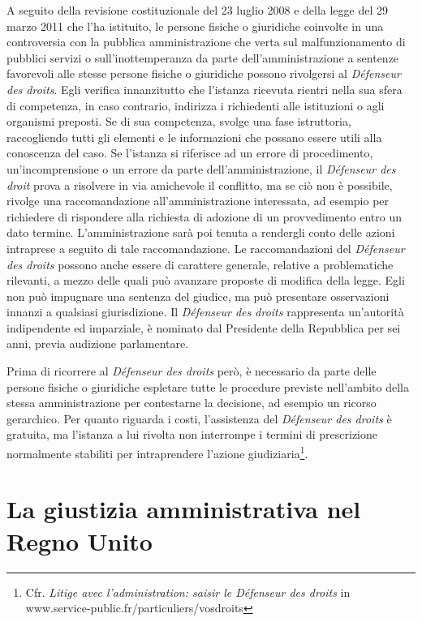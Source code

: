 \documentclass[12pt,it,a4paper,]{report}
\begin{document}
A seguito della revisione costituzionale del 23 luglio 2008 e della
legge del 29 marzo 2011 che l'ha istituito, le persone fisiche o
giuridiche coinvolte in una controversia con la pubblica amministrazione
che verta sul malfunzionamento di pubblici servizi o sull'inottemperanza
da parte dell'amministrazione a sentenze favorevoli alle stesse persone
fisiche o giuridiche possono rivolgersi al \emph{Défenseur des droits}.
Egli verifica innanzitutto che l'istanza ricevuta rientri nella sua
sfera di competenza, in caso contrario, indirizza i richiedenti alle
istituzioni o agli organismi preposti. Se di sua competenza, svolge una
fase istruttoria, raccogliendo tutti gli elementi e le informazioni che
possano essere utili alla conoscenza del caso. Se l'istanza si riferisce
ad un errore di procedimento, un'incomprensione o un errore da parte
dell'amministrazione, il \emph{Défenseur des droit} prova a risolvere in
via amichevole il conflitto, ma se ciò non è possibile, rivolge una
raccomandazione all'amministrazione interessata, ad esempio per
richiedere di rispondere alla richiesta di adozione di un provvedimento
entro un dato termine. L'amministrazione sarà poi tenuta a rendergli
conto delle azioni intraprese a seguito di tale raccomandazione. Le
raccomandazioni del \emph{Défenseur des droits} possono anche essere di
carattere generale, relative a problematiche rilevanti, a mezzo delle
quali può avanzare proposte di modifica della legge. Egli non può
impugnare una sentenza del giudice, ma può presentare osservazioni
innanzi a qualsiasi giurisdizione. Il \emph{Défenseur des droits}
rappresenta un'autorità indipendente ed imparziale, è nominato dal
Presidente della Repubblica per sei anni, previa audizione parlamentare.

Prima di ricorrere al \emph{Défenseur des droits} però, è necessario da
parte delle persone fisiche o giuridiche espletare tutte le procedure
previste nell'ambito della stessa amministrazione per contestarne la
decisione, ad esempio un ricorso gerarchico. Per quanto riguarda i
costi, l'assistenza del \emph{Défenseur des droits} è gratuita, ma
l'istanza a lui rivolta non interrompe i termini di prescrizione
normalmente stabiliti per intraprendere l'azione giudiziaria\footnote{Cfr.
  \emph{Litige avec l'administration: saisir le Défenseur des droits} in
  www.service-public.fr/particuliers/vosdroits}.

\hypertarget{la-giustizia-amministrativa-nel-regno-unito}{%
\chapter{La giustizia amministrativa nel Regno
Unito}\label{la-giustizia-amministrativa-nel-regno-unito}}
\end{document}
